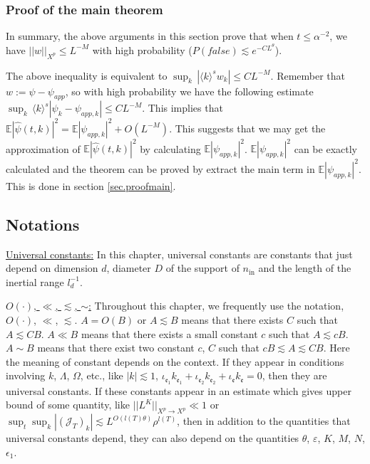 \subsubsection{Proof of the main theorem} In summary, the above arguments in this section prove that when $t\le \alpha^{-2}$, we have $||w||_{X^p}\le L^{-M}$ with high probability ($P(\textit{false})\lesssim e^{-CL^{\theta}}$).   


The above inequality is equivalent to $\sup_k\, |\langle k \rangle^s w_k|\le CL^{-M}$. Remember that $w:=\psi-\psi_{app}$, so with high probability we have the following estimate $\sup_k\, \langle k \rangle^s |\psi_k-\psi_{app,k}|\le CL^{-M}$. This implies that $\mathbb E |\widehat \psi(t, k)|^2=\mathbb E |\psi_{app,k}|^2+O(L^{-M})$. This suggests that we may get the approximation of $\mathbb E |\widehat \psi(t, k)|^2$ by calculating $\mathbb E |\psi_{app,k}|^2$. $\mathbb E |\psi_{app,k}|^2$ can be exactly calculated and the theorem can be proved by extract the main term in $\mathbb E |\psi_{app,k}|^2$. This is done in section \ref{sec.proofmain}.

 
\subsection{Notations}\label{sec.notat} 

\underline{Universal constants:} In this chapter, universal constants are constants that just depend on dimension $d$, diameter $D$ of the support of $n_{\text{in}}$ and the length of the inertial range $l^{-1}_d$. 

\underline{$O(\cdot)$, $\ll$, $\lesssim$, $\sim$:} Throughout this chapter, we frequently use the notation, $O(\cdot)$, $\ll$, $\lesssim$. $A=O(B)$ or $A\lesssim B$ means that there exists $C$ such that $A\lesssim CB$. $A\ll B$ means that there exists a small constant $c$ such that $A\lesssim cB$. $A\sim B$ means that there exist two constant $c$, $C$ such that $cB\lesssim A\lesssim CB$. Here the meaning of constant depends on the context. If they appear in conditions involving $k$, $\Lambda$, $\Omega$, etc., like $|k|\lesssim 1$, $\iota_{\mathfrak{e}_1}k_{\mathfrak{e}_1}+\iota_{\mathfrak{e}_2}k_{\mathfrak{e}_2}+\iota_{\mathfrak{e}}k_{\mathfrak{e}}=0$, then they are universal constants. If these constants appear in an estimate which gives upper bound of some quantity, like $||L^K||_{X^p\rightarrow X^p}\ll 1$ or $\sup_t\sup_k  |(\mathcal{J}_T)_k|\lesssim L^{O(l(T)\theta)} \rho^{l(T)}$, then in addition to the quantities that universal constants depend, they can also depend on the quantities $\theta$, $\varepsilon$, $K$, $M$, $N$, $\epsilon_1$.

